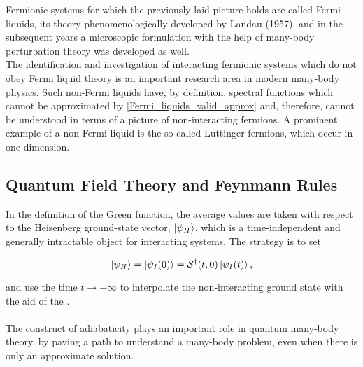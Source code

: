 \begin{tcolorbox}[colback=yellow, 
title = Physical Context]

Fermionic systems for which the previously laid picture holds are called Fermi liquids, its theory phenomenologically developed by Landau (1957), and in the subsequent years a microscopic formulation with the help of many-body perturbation theory was developed as well. \\

The identification and investigation of interacting fermionic systems which do not obey Fermi liquid theory is an important research area in modern many-body physics. Such non-Fermi liquids have, by definition, spectral functions which cannot be approximated by \cref{Fermi_liquids_valid_approx} and, therefore, cannot be understood in terms of a picture of non-interacting fermions. A prominent example of a non-Fermi liquid is the so-called Luttinger fermions, which occur in one-dimension.  
\end{tcolorbox}

\clearpage

\subsection{\textbf{Quantum Field Theory and Feynmann Rules}}


In the definition of the Green function, the average values are taken with respect to the Heisenberg ground-state vector, $\ket{\psi_H}$, which is a time-independent and generally intractable object for interacting systems. The strategy is to set 

$$
    \ket{\psi_H} = \ket{\psi_I (0)} = \mathcal{S}^\dagger(t,0) \ket{\psi_I (t)},
$$

and use the time $t \rightarrow -\infty$ to interpolate the non-interacting ground state with the aid of the . \medbreak

\paragraph{}
\label{section:adiabaticity_in_QFT}

The construct of adiabaticity plays an important role in quantum many-body theory, by paving a path to understand a many-body problem, even when there is only an approximate solution. \\

